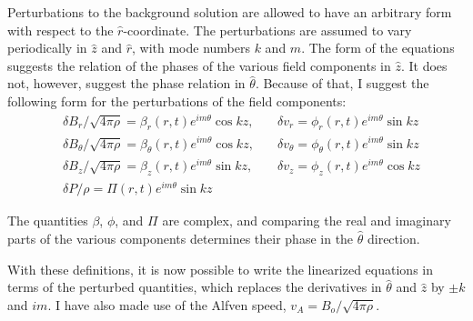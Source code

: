 \documentclass[letterpaper]{article}
\begin{document}
Perturbations to the background solution are allowed to have an
arbitrary form with respect to the $\hat{r}$-coordinate.  The
perturbations are assumed to vary periodically in $\hat{z}$ and
$\hat{r}$, with mode numbers $k$ and $m$.  The form of the equations
suggests the relation of the phases of the various field components in
$\hat{z}$.  It does not, however, suggest the phase relation in
$\hat{\theta}$.  Because of that, I suggest the following form for the
perturbations of the field components:
\begin{align*}
&\delta B_r / \sqrt{4\pi\rho} = \beta_r (r,t)e^{im\theta}\cos{kz},\quad
&\delta v_r = \phi_r (r,t) e^{im\theta} \sin{kz}
\\
&\delta B_\theta / \sqrt{4\pi\rho} = \beta_\theta (r,t)e^{im\theta}\cos{kz},\quad
&\delta v_\theta = \phi_\theta (r,t) e^{im\theta} \sin{kz}
\\
&\delta B_z / \sqrt{4\pi\rho} = \beta_z (r,t)e^{im\theta}\sin{kz},\quad
&\delta v_z = \phi_z (r,t) e^{im\theta} \cos{kz}
\\
&\delta P / \rho = \Pi (r,t) e^{im\theta} \sin{kz}&
\end{align*}

The quantities $\beta$, $\phi$, and $\Pi$ are complex, and comparing
the real and imaginary parts of the various components determines
their phase in the $\hat{\theta}$ direction.

With these definitions, it is now possible to write the linearized
equations in terms of the perturbed quantities, which replaces the
derivatives in $\hat{\theta}$ and $\hat{z}$ by $\pm k$ and $im$.  I
have also made use of the Alfven speed, $v_A = B_o / \sqrt{4\pi\rho}$.
\end{document}
